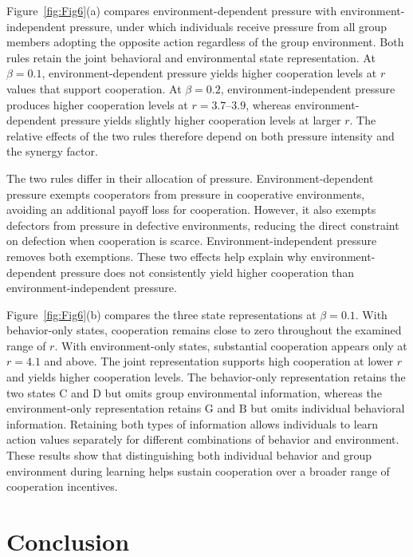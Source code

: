 \documentclass[%
  aip,
  amsmath,amssymb,
  reprint,
  showkeys,
]{revtex4-1}
\begin{document}
Figure~\ref{fig:Fig6}(a) compares environment-dependent pressure with environment-independent pressure, under which individuals receive pressure from all group members adopting the opposite action regardless of the group environment. Both rules retain the joint behavioral and environmental state representation. At $\beta=0.1$, environment-dependent pressure yields higher cooperation levels at $r$ values that support cooperation. At $\beta=0.2$, environment-independent pressure produces higher cooperation levels at $r=3.7$--$3.9$, whereas environment-dependent pressure yields slightly higher cooperation levels at larger $r$. The relative effects of the two rules therefore depend on both pressure intensity and the synergy factor.

The two rules differ in their allocation of pressure. Environment-dependent pressure exempts cooperators from pressure in cooperative environments, avoiding an additional payoff loss for cooperation. However, it also exempts defectors from pressure in defective environments, reducing the direct constraint on defection when cooperation is scarce. Environment-independent pressure removes both exemptions. These two effects help explain why environment-dependent pressure does not consistently yield higher cooperation than environment-independent pressure.

Figure~\ref{fig:Fig6}(b) compares the three state representations at $\beta=0.1$. With behavior-only states, cooperation remains close to zero throughout the examined range of $r$. With environment-only states, substantial cooperation appears only at $r=4.1$ and above. The joint representation supports high cooperation at lower $r$ and yields higher cooperation levels. The behavior-only representation retains the two states $\mathrm{C}$ and $\mathrm{D}$ but omits group environmental information, whereas the environment-only representation retains $\mathrm{G}$ and $\mathrm{B}$ but omits individual behavioral information. Retaining both types of information allows individuals to learn action values separately for different combinations of behavior and environment. These results show that distinguishing both individual behavior and group environment during learning helps sustain cooperation over a broader range of cooperation incentives.


\section{Conclusion}\label{sec4}
\end{document}
